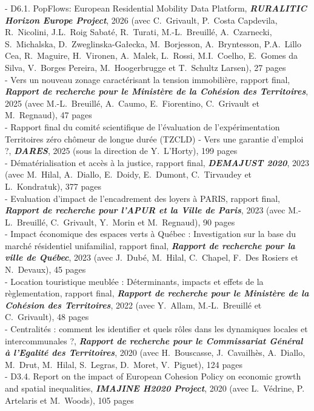 \documentclass[a4paper,12pt]{article}
\begin{document}
\noindent
- D6.1. PopFlows: European Residential Mobility Data Platform, \textit{\textbf{RURALITIC Horizon Europe Project}}, 2026 (avec C.~Grivault, P.~Costa Capdevila, R.~Nicolini, J.L.~Roig Sabaté, R.~Turati, M.-L.~Breuillé, A.~Czarnecki, S.~Michalska, D.~Zweglinska-Ga\l{}ecka, M.~Borjesson, A.~Bryntesson, P.A.~Lillo Cea, R.~Maguire, H.~Vironen, A.~Malek, L.~Rossi, M.I.~Coelho, E.~Gomes da Silva, V.~Borges Pereira, M.~Hoogerbrugge et T.~Schultz Larsen), 27 pages \\
- Vers un nouveau zonage caractérisant la tension immobilière, rapport final, \textit{\textbf{Rapport de recherche pour le Ministère de la Cohésion des Territoires}}, 2025 (avec M.-L.~Breuillé, A.~Caumo, E.~Fiorentino, C.~Grivault et M.~Regnaud), 47 pages \\
- Rapport final du comité scientifique de l'évaluation de l'expérimentation \og{}Territoires zéro chômeur de longue durée\fg{} (TZCLD) - Vers une garantie d'emploi ?, \textit{\textbf{DARES}}, 2025 (sous la direction de Y.~L'Horty), 199 pages \\
- Dématérialisation et accès à la justice, rapport final, \textit{\textbf{DEMAJUST 2020}}, 2023 (avec M.~Hilal, A.~Diallo, E.~Doidy, E.~Dumont, C.~Tirvaudey et L.~Kondratuk), 377 pages \\
- Evaluation d'impact de l'encadrement des loyers à PARIS, rapport final, \textit{\textbf{Rapport de recherche pour l'APUR et la Ville de Paris}}, 2023 (avec M.-L.~Breuillé, C.~Grivault, Y.~Morin et M.~Regnaud), 90 pages \\
- Impact économique des espaces verts à Québec : Investigation sur la base du marché résidentiel unifamilial, rapport final, \textit{\textbf{Rapport de recherche pour la ville de Québec}}, 2023 (avec J.~Dubé, M.~Hilal, C.~Chapel, F.~Des Rosiers et N.~Devaux), 45 pages \\
- Location touristique meublée : Déterminants, impacts et effets de la règlementation, rapport final, \textit{\textbf{Rapport de recherche pour le Ministère de la Cohésion des Territoires}}, 2022 (avec Y.~Allam, M.-L.~Breuillé et C.~Grivault), 48 pages \\
- Centralités : comment les identifier et quels rôles dans les dynamiques locales et intercommunales ?, \textit{\textbf{Rapport de recherche pour le Commissariat Général à l'Egalité des Territoires}}, 2020 (avec H.~Bouscasse, J.~Cavailhès, A.~Diallo, M.~Drut, M.~Hilal, S.~Legras, D.~Moret, V.~Piguet), 124 pages \\
- D3.4. Report on the impact of European Cohesion Policy on economic growth and spatial inequalities, \textit{\textbf{IMAJINE H2020 Project}}, 2020 (avec L.~Védrine, P. Artelaris et M.~Woods), 105 pages \\
\end{document}
